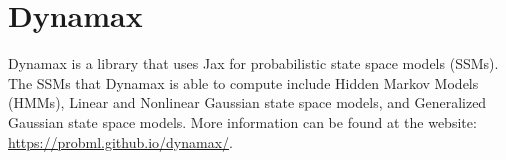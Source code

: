 \section*{Dynamax}
Dynamax is a library that uses Jax for probabilistic state space models (SSMs).
The SSMs that Dynamax is able to compute include Hidden Markov Models (HMMs), Linear and Nonlinear Gaussian state space models, and Generalized Gaussian state space models.
More information can be found at the website: \url{https://probml.github.io/dynamax/}.
